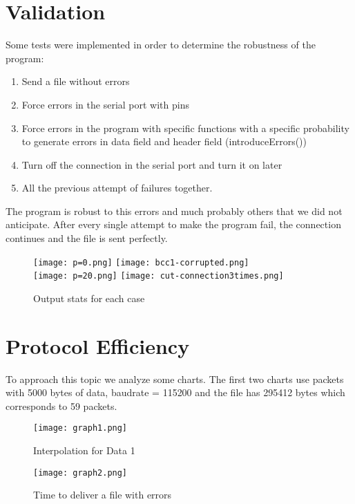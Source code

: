 \documentclass[contents.tex]{subfiles}
\begin{document}
\section{Validation}
\label{sec:validation}

Some tests were implemented in order to determine the robustness of the program:
\begin{enumerate}[label=(\alph*),noitemsep,rightmargin=3em]
	\item Send a file without errors
	\item Force errors in the serial port with pins
	\item Force errors in the program with specific functions with a specific probability to generate errors in data field and header field (introduceErrors())
	\item Turn off the connection in the serial port and turn it on later
	\item All the previous attempt of failures together.
\end{enumerate}

The program is robust to this errors and much probably others that we did not anticipate. After every single attempt to make the program fail, the connection continues and the file is sent perfectly.

\begin{figure}[htbp]
\centering
\texttt{[image: p=0.png]}
\texttt{[image: bcc1-corrupted.png]}\\
\medskip
\texttt{[image: p=20.png]}
\texttt{[image: cut-connection3times.png]}
\caption{Output stats for each case}
\label{fig:example}
\end{figure}

\section{Protocol Efficiency}
\label{sec:pefficiency}

To approach this topic we analyze some charts. The first two charts use packets with 5000 bytes of data, baudrate = 115200 and the file has 295412 bytes which corresponds to 59 packets. 

\begin{figure}[htbp]
\begin{minipage}{0.48\textwidth}
\centering
\texttt{[image: graph1.png]}
\caption{Interpolation for Data 1}
\label{Fig:Data1}
\end{minipage}\hfill
\begin{minipage}{0.48\textwidth}
\centering
\texttt{[image: graph2.png]}
\caption{Time to deliver a file with errors}
\label{Fig:Data2}
\end{minipage}
\end{figure}
\end{document}
